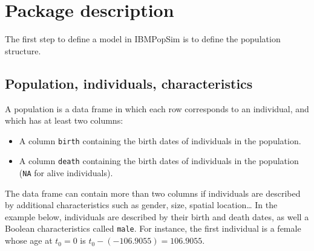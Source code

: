 \begin{Shaded}
\begin{Highlighting}[]
\OperatorTok{$}\StringTok{ }

\NormalTok{events\_bounds[}\NormalTok{] \textless{}{-}}\StringTok{ }\OperatorTok{$}\OperatorTok{*}\StringTok{ }\OperatorTok{$}\OperatorTok{*}\StringTok{ }

\StringTok{ }
                   \NormalTok{)}
\end{Highlighting}
\end{Shaded}

\hypertarget{package-description}{%
\section{Package description}\label{package-description}}

The first step to define a model in IBMPopSim is to define the population structure.

\hypertarget{population}{%
\subsection{Population, individuals, characteristics}\label{population}}

A population is a data frame in which each row corresponds to an individual, and which has at least two columns:

\begin{itemize}
\tightlist
\item
  A column \texttt{birth} containing the birth dates of individuals in the population.
\item
  A column \texttt{death} containing the birth dates of individuals in the population (\texttt{NA} for alive individuals).
\end{itemize}

The data frame can contain more than two columns if individuals are described by additional characteristics such as gender, size, spatial location\ldots{}
In the example below, individuals are described by their birth and death dates, as well a Boolean characteristics called \texttt{male}. For instance, the first individual is a female whose age at \(t_0=0\) is \(t_0 - (-106.9055) = 106.9055\).

